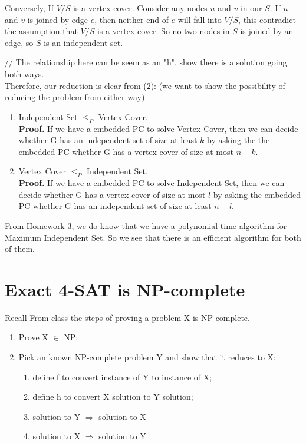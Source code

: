 \documentclass{article}
\begin{document}
Conversely, If $V/S$ is a vertex cover. Consider any nodes $u$ and $v$ in our $S$. If $u$ and $v$ is joined by edge $e$, then neither end of $e$ will fall into $V/S$, this contradict the assumption that $V/S$ is a vertex cover. So no two nodes in $S$ is joined by an edge, so $S$ is an independent set. 

$//$ The relationship here can be seem as an "h", show there is a
solution going both ways. \\
Therefore, our reduction is clear from (2): (we want to show the possibility of reducing the problem from either way)
\begin{enumerate}
    \item Independent Set \(\leq_{P}\) Vertex Cover.\\
    \textbf{Proof.} If we have a embedded PC to solve Vertex Cover, then we can decide whether G has an independent set of size at least $k$ by asking the the embedded PC whether G has a vertex cover of size at most $n − k$.
    \item Vertex Cover \(\leq_{P}\) Independent Set.\\
    \textbf{Proof.} If we have a embedded PC to solve Independent Set, then we can decide whether G has a vertex cover of size at most $l$ by asking the embedded PC whether G has an independent set of size at least $n − l$.
\end{enumerate}
From Homework 3, we do know that we have a polynomial time algorithm for Maximum Independent Set. So we see that there is an efficient algorithm for both of them. 

\section{Exact 4-SAT is NP-complete}
Recall From class the steps of proving a problem X is NP-complete.
\begin{enumerate}
    \item Prove X $\in$ NP;
    \item Pick an known NP-complete problem Y and show that it reduces to X; 
    \begin{enumerate}
        \item define f to convert instance of Y to instance of X;
        \item define h to convert X solution to Y solution; 
        \item solution to Y $\Rightarrow$ solution to X 
        \item solution to X $\Rightarrow$ solution to Y
        \end{enumerate}
\end{enumerate}
\end{document}
